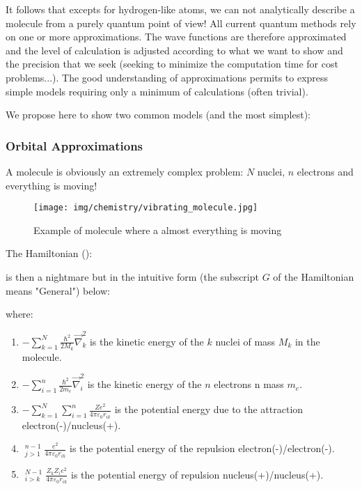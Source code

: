 	It follows that excepts for hydrogen-like atoms, we can not analytically describe a molecule from a purely quantum point of view! All current quantum methods rely on one or more approximations. The wave functions are therefore approximated and the level of calculation is adjusted according to what we want to show and the precision that we seek (seeking to minimize the computation time for cost problems...). The good understanding of approximations permits to express simple models requiring only a minimum of calculations (often trivial).
	
	We propose here to show two common models (and the most simplest):
	
	\subsubsection{Orbital Approximations}
	A molecule is obviously an extremely complex problem: $N$ nuclei, $n$ electrons and everything is moving!
	\begin{figure}[H]
		\begin{center}
		\texttt{[image: img/chemistry/vibrating\_molecule.jpg]}
		\end{center}	
		\caption{Example of molecule where a almost everything is moving}
	\end{figure}
	The Hamiltonian ():
	
	is then a nightmare but in the intuitive form (the subscript $G$ of the Hamiltonian means "General") below:
	
	where:
	
	\begin{enumerate}
		\item $\displaystyle-\sum_{k=1}^{N}\frac{\hbar^2}{2M_k}\vec{\nabla}_k^2$ is the kinetic energy of the $k$ nuclei of mass $M_k$ in the molecule.

		\item $\displaystyle-\sum_{i=1}^{n}\frac{\hbar^2}{2m_e}\vec{\nabla}_i^2$  is the kinetic energy of the $n$ electrons n mass $m_e$.

		\item $\displaystyle-\sum_{k=1}^{N}\sum_{i=1}^{n}\frac{Ze^2}{4\pi\varepsilon_0 r_{ik}}$ is the potential energy due to the attraction electron(-)/nucleus(+).

		\item $\displaystyle\mathop{\sum_{i=1}}_{j>1}^{n-1}\frac{e^2}{4\pi\varepsilon_0 r_{ik}}$ is the potential energy of the repulsion electron(-)/electron(-).

		\item $\displaystyle\mathop{\sum_{k=1}}_{i>k}^{N-1}\frac{Z_kZ_ie^2}{4\pi\varepsilon_0 r_{ik}}$ is the potential energy of repulsion nucleus(+)/nucleus(+).
	\end{enumerate}

